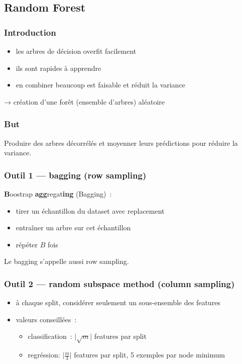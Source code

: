 \subsection{Random Forest}

\begin{frame}
  \frametitle{Introduction}
  \begin{itemize}
  \item les arbres de décision overfit facilement
  \item ils sont rapides à apprendre
  \item en combiner beaucoup est faisable et réduit la variance
  \end{itemize}
  → création d'une forêt (ensemble d'arbres) aléatoire
\end{frame}

\begin{frame}
  \frametitle{But}
  Produire des arbres décorrélés et moyenner leurs prédictions pour
  réduire la variance.
\end{frame}

\begin{frame}
  \frametitle{Outil 1 — bagging (row sampling)}
  \textbf{B}oostrap \textbf{agg}regat\textbf{ing} (Bagging) :
  \begin{itemize}
  \item tirer un échantillon du dataset avec replacement
  \item entraîner un arbre sur cet échantillon
  \item répéter $B$ fois
  \end{itemize}
  Le bagging s'appelle aussi row sampling.
\end{frame}

\begin{frame}
  \frametitle{Outil 2 — random subspace method (column sampling)}
  \begin{itemize}
  \item à chaque split, considérer seulement un sous-ensemble des
    features
  \item valeurs conseillées :
    \begin{itemize}
    \item classification : $\lvert\sqrt m\rvert$ features par split
    \item regréssion: $\lvert\frac{m}{3}\rvert$ features par split, 5
      exemples par node minimum
    \end{itemize}
  \end{itemize}
\end{frame}

